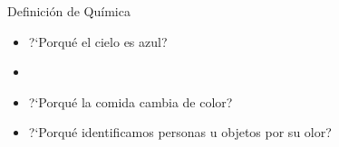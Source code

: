 \documentclass{beamer}
\begin{document}
\begin{frame}{Definici\'on de Qu\'imica}
\begin{itemize} 
    \justifying
  \item ?`Porqu\'e el cielo es azul?
  \item \lipsum[2]
  \item ?`Porqu\'e la comida cambia de color?
  \item ?`Porqu\'e identificamos personas u objetos por su olor?
\end{itemize}
\end{frame}
\end{document}
